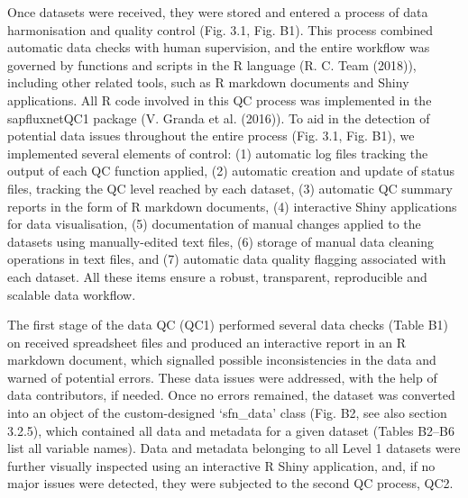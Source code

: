 \documentclass[11pt,twoside]{reedthesis}
\begin{document}
Once datasets were received, they were stored and entered a process of
data harmonisation and quality control (Fig. 3.1, Fig. B1). This process
combined automatic data checks with human supervision, and the entire
workflow was governed by functions and scripts in the R language (R. C.
Team (2018)), including other related tools, such as R markdown
documents and Shiny applications. All R code involved in this QC process
was implemented in the sapfluxnetQC1 package (V. Granda et al. (2016)).
To aid in the detection of potential data issues throughout the entire
process (Fig. 3.1, Fig. B1), we implemented several elements of control:
(1) automatic log files tracking the output of each QC function applied,
(2) automatic creation and update of status files, tracking the QC level
reached by each dataset, (3) automatic QC summary reports in the form of
R markdown documents, (4) interactive Shiny applications for data
visualisation, (5) documentation of manual changes applied to the
datasets using manually-edited text files, (6) storage of manual data
cleaning operations in text files, and (7) automatic data quality
flagging associated with each dataset. All these items ensure a robust,
transparent, reproducible and scalable data workflow.\par

The first stage of the data QC (QC1) performed several data checks
(Table B1) on received spreadsheet files and produced an interactive
report in an R markdown document, which signalled possible
inconsistencies in the data and warned of potential errors. These data
issues were addressed, with the help of data contributors, if needed.
Once no errors remained, the dataset was converted into an object of the
custom-designed `sfn\_data' class (Fig. B2, see also section 3.2.5),
which contained all data and metadata for a given dataset (Tables B2--B6
list all variable names). Data and metadata belonging to all Level 1
datasets were further visually inspected using an interactive R Shiny
application, and, if no major issues were detected, they were subjected
to the second QC process, QC2.\par
\end{document}
